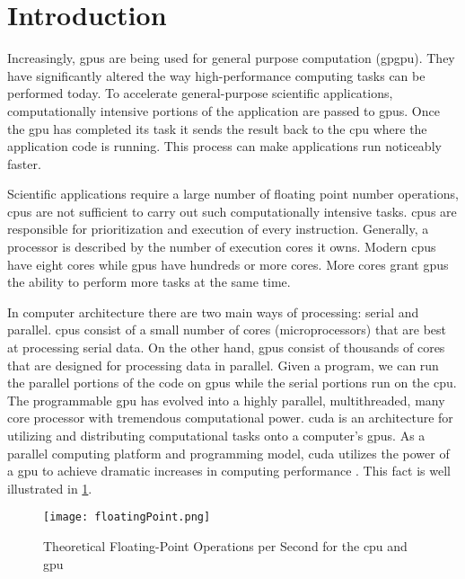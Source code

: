 \section{Introduction}

Increasingly, \Glspl{gpu} are being used for general purpose computation
(\gls{gpgpu}). They have significantly altered the way high-performance
computing tasks can be performed today. To accelerate general-purpose
scientific applications, computationally intensive portions of the application
are passed to \glspl{gpu}. Once the \gls{gpu} has completed its task it sends
the result back to the \Gls{cpu} where the application code is running. This
process can make applications run noticeably faster.

Scientific applications require a large number of floating point number
operations, \Glspl{cpu} are not sufficient to carry out such computationally
intensive tasks. \glspl{cpu} are responsible for prioritization and execution
of every instruction. Generally, a processor is described by the number of
execution cores it owns. Modern \glspl{cpu} have eight cores while \Glspl{gpu}
have hundreds or more cores. More cores grant \glspl{gpu} the ability to
perform more tasks at the same time.

In computer architecture there are two main ways of processing: serial and
parallel. \Glspl{cpu} consist of a small number of cores (microprocessors) that
are best at processing serial data. On the other hand, \glspl{gpu} consist of
thousands of cores that are designed for processing data in parallel. Given a
program, we can run the parallel portions of the code on \glspl{gpu} while the
serial portions run on the \gls{cpu}\@. The programmable \gls{gpu} has evolved
into a highly parallel, multithreaded, many core processor with tremendous
computational power. \Gls{cuda} is an architecture for utilizing and
distributing computational tasks onto a computer's \glspl{gpu}. As a parallel
computing platform and programming model, \gls{cuda} utilizes the power of
a \gls{gpu} to achieve dramatic increases in computing performance
\cite{website:cudaCProgrammingGuide}. This fact is well illustrated in
\cref{fig:flops_gpu_vs_cpu}.

\begin{figure}[htb]
\centering
\texttt{[image: floatingPoint.png]}
\caption{Theoretical Floating-Point Operations per Second for the \gls{cpu} and
         \gls{gpu} \cite{website:cudaCProgrammingGuide}}
\label{fig:flops_gpu_vs_cpu}
\end{figure}

